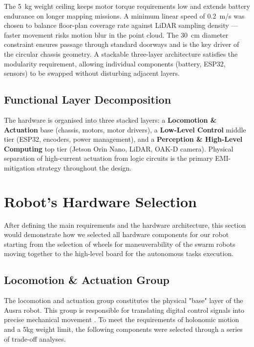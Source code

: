 The 5~kg weight ceiling keeps motor torque requirements low and extends battery endurance on longer mapping missions. A minimum linear speed of 0.2~m/s was chosen to balance floor-plan coverage rate against LiDAR sampling density — faster movement risks motion blur in the point cloud. The 30~cm diameter constraint ensures passage through standard doorways and is the key driver of the circular chassis geometry. A stackable three-layer architecture satisfies the modularity requirement, allowing individual components (battery, ESP32, sensors) to be swapped without disturbing adjacent layers.

\subsection{Functional Layer Decomposition}
The hardware is organised into three stacked layers: a \textbf{Locomotion \& Actuation} base (chassis, motors, motor drivers), a \textbf{Low-Level Control} middle tier (ESP32, encoders, power management), and a \textbf{Perception \& High-Level Computing} top tier (Jetson Orin Nano, LiDAR, OAK-D camera). Physical separation of high-current actuation from logic circuits is the primary EMI-mitigation strategy throughout the design.

\section{Robot's Hardware Selection}
\label{sec:hardware_selection}

After defining the main requirements and the hardware architecture, this section would demonstrate how we selected all hardware components for our robot starting from the selection of wheels for maneuverability of the swarm robots moving together to the high-level board for the autonomous tasks execution.

\subsection{Locomotion \& Actuation Group}
The locomotion and actuation group constitutes the physical "base" layer of the Ausra robot. This group is responsible for translating digital control signals into precise mechanical movement \cite{corke2017robotics}. To meet the requirements of holonomic motion and a 5kg weight limit, the following components were selected through a series of trade-off analyses.

